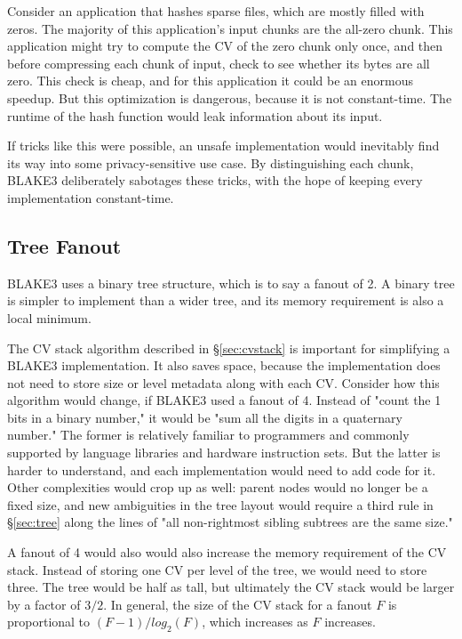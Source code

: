 \documentclass[11pt,notitlepage,a4paper]{article}
\begin{document}
Consider an application that hashes sparse files, which are mostly filled with
zeros. The majority of this application's input chunks are the all-zero chunk.
This application might try to compute the CV of the zero chunk only once, and
then before compressing each chunk of input, check to see whether its bytes are
all zero. This check is cheap, and for this application it could be an enormous
speedup. But this optimization is dangerous, because it is not constant-time.
The runtime of the hash function would leak information about its input.

If tricks like this were possible, an unsafe implementation would inevitably
find its way into some privacy-sensitive use case. By distinguishing each
chunk, BLAKE3 deliberately sabotages these tricks, with the hope of keeping
every implementation constant-time.

\subsection{Tree Fanout}\label{sec:treefanout}

BLAKE3 uses a binary tree structure, which is to say a fanout of 2. A binary
tree is simpler to implement than a wider tree, and its memory requirement is
also a local minimum.

The CV stack algorithm described in \S\ref{sec:cvstack} is important for
simplifying a BLAKE3 implementation. It also saves space, because the
implementation does not need to store size or level metadata along with each
CV. Consider how this algorithm would change, if BLAKE3 used a fanout of 4.
Instead of "count the 1 bits in a binary number," it would be "sum all the
digits in a quaternary number." The former is relatively familiar to
programmers and commonly supported by language libraries and hardware
instruction sets. But the latter is harder to understand, and each
implementation would need to add code for it. Other complexities would crop up
as well: parent nodes would no longer be a fixed size, and new ambiguities in
the tree layout would require a third rule in \S\ref{sec:tree} along the lines
of "all non-rightmost sibling subtrees are the same size."

A fanout of 4 would also would also increase the memory requirement of the CV
stack. Instead of storing one CV per level of the tree, we would need to store
three. The tree would be half as tall, but ultimately the CV stack would be
larger by a factor of $3/2$. In general, the size of the CV stack for a fanout
$F$ is proportional to $(F-1)/log_2(F)$, which increases as $F$ increases.
\end{document}
